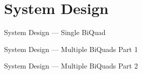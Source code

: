 \documentclass{beamer}
\begin{document}
\section{System Design}
\begin{frame}{System Design --- Single BiQuad}
\end{frame}
\begin{frame}{System Design --- Multiple BiQuads Part 1}
\end{frame}
\begin{frame}{System Design --- Multiple BiQuads Part 2}
\end{frame}
\end{document}
